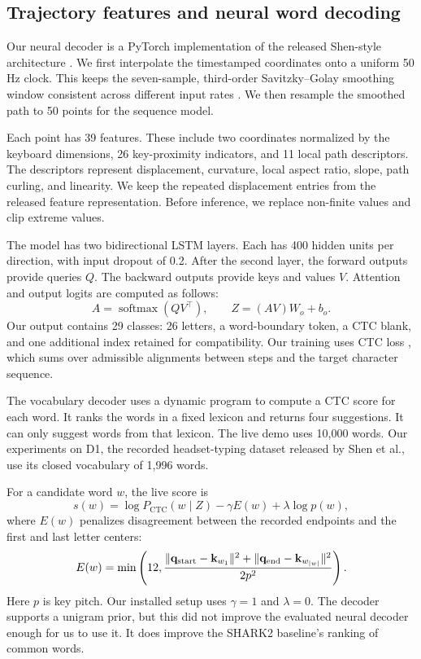 \documentclass[preprint,12pt]{elsarticle}
\begin{document}
\subsection{Trajectory features and neural word decoding}
Our neural decoder is a PyTorch implementation of the released Shen-style architecture \cite{shen2023,shencode}. We first interpolate the timestamped coordinates onto a uniform 50 Hz clock. This keeps the seven-sample, third-order Savitzky--Golay smoothing window consistent across different input rates \cite{savitzkygolay}. We then resample the smoothed path to 50 points for the sequence model.

Each point has 39 features. These include two coordinates normalized by the keyboard dimensions, 26 key-proximity indicators, and 11 local path descriptors. The descriptors represent displacement, curvature, local aspect ratio, slope, path curling, and linearity. We keep the repeated displacement entries from the released feature representation. Before inference, we replace non-finite values and clip extreme values.

The model has two bidirectional LSTM layers. Each has 400 hidden units per direction, with input dropout of 0.2. After the second layer, the forward outputs provide queries $Q$. The backward outputs provide keys and values $V$. Attention and output logits are computed as follows:
\begin{equation}
A=\operatorname{softmax}(QV^\top),\qquad Z=(AV)W_o+b_o.
\end{equation}
Our output contains 29 classes: 26 letters, a word-boundary token, a CTC blank, and one additional index retained for compatibility. Our training uses CTC loss \cite{ctc}, which sums over admissible alignments between steps and the target character sequence.

The vocabulary decoder uses a dynamic program to compute a CTC score for each word. It ranks the words in a fixed lexicon and returns four suggestions. It can only suggest words from that lexicon. The live demo uses 10,000 words. Our experiments on D1, the recorded headset-typing dataset released by Shen et al., use its closed vocabulary of 1,996 words.

For a candidate word $w$, the live score is
\begin{equation}
s(w)=\log P_{\mathrm{CTC}}(w\mid Z)-\gamma E(w)+\lambda\log p(w),
\end{equation}
where $E(w)$ penalizes disagreement between the recorded endpoints and the first and last letter centers:
\begin{equation}
E(w)=\min\left(12,\frac{\lVert\mathbf{q}_{\rm start}-\mathbf{k}_{w_1}\rVert^2+
\lVert\mathbf{q}_{\rm end}-\mathbf{k}_{w_{|w|}}\rVert^2}{2p^2}\right).
\end{equation}
Here $p$ is key pitch. Our installed setup uses $\gamma=1$ and $\lambda=0$. The decoder supports a unigram prior, but this did not improve the evaluated neural decoder enough for us to use it. It does improve the SHARK2 baseline's ranking of common words.
\end{document}
